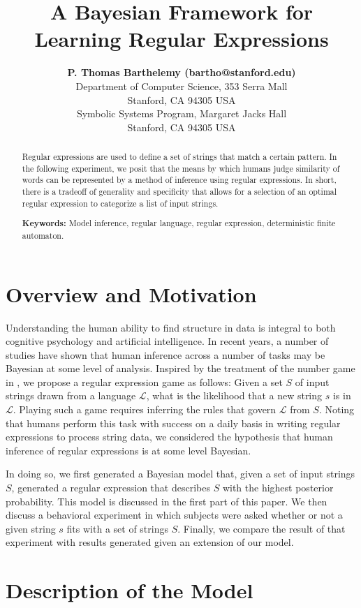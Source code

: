\documentclass[10pt,letterpaper]{article}
\title{A Bayesian Framework for Learning Regular Expressions}
\author{{\large \bf{P. Thomas Barthelemy} (bartho@stanford.edu)} \\
  Department of Computer Science, 353 Serra Mall \\
  Stanford, CA 94305 USA
  \AND {\large \bf Nicholas Borg (nickborg@stanford.edu)} \\
  Symbolic Systems Program, Margaret Jacks Hall \\
  Stanford, CA 94305 USA}
\begin{document}
\maketitle


\begin{abstract}
Regular expressions are used to define a set of strings that match a certain pattern. In the following experiment, we posit that the means by which humans judge similarity of words can be represented by a method of inference using regular expressions. In short, there is a tradeoff of generality and specificity that allows for a selection of an optimal regular expression to categorize a list of input strings.

\textbf{Keywords:} 
Model inference, regular language, regular expression, deterministic finite automaton.
\end{abstract}


\section{Overview and Motivation}
Understanding the human ability to find structure in data is integral to both cognitive psychology and artificial intelligence. In recent years, a number of studies have shown that human inference across a number of tasks may be Bayesian at some level of analysis. Inspired by the treatment of the number game in , we propose a regular expression game as follows: Given a set $S$ of input strings drawn from a language $\mathcal{L}$, what is the likelihood that a new string $s$ is in $\mathcal{L}$. Playing such a game requires inferring the rules that govern $\mathcal{L}$ from $S$. Noting that humans perform this task  with success on a daily basis in writing regular expressions to process string data, we considered the hypothesis that human inference of regular expressions is at some level Bayesian.

In doing so, we first generated a Bayesian model that, given a set of input strings $S$, generated a regular expression that describes $S$ with the highest posterior probability. This model is discussed in the first part of this paper. We then discuss a behavioral experiment in which subjects were asked whether or not a given string $s$ fits with a set of strings $S$. Finally, we compare the result of that experiment with results generated given an extension of our model.  

\section{Description of the Model}
\end{document}
